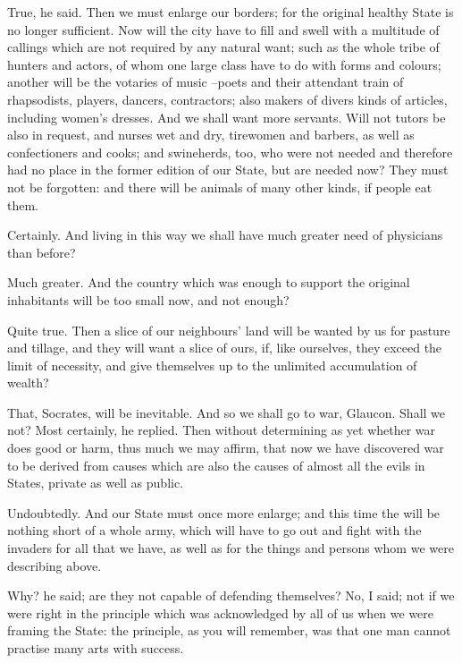 True, he said.
Then we must enlarge our borders; for the original healthy State is no longer sufficient. Now will the city have to fill and swell with a multitude of callings which are not required by any natural want; such as the whole tribe of hunters and actors, of whom one large class have to do with forms and colours; another will be the votaries of music --poets and their attendant train of rhapsodists, players, dancers, contractors; also makers of divers kinds of articles, including women's dresses. And we shall want more servants. Will not tutors be also in request, and nurses wet and dry, tirewomen and barbers, as well as confectioners and cooks; and swineherds, too, who were not needed and therefore had no place in the former edition of our State, but are needed now? They must not be forgotten: and there will be animals of many other kinds, if people eat them.

Certainly.
And living in this way we shall have much greater need of physicians than before?

Much greater.
And the country which was enough to support the original inhabitants will be too small now, and not enough?

Quite true.
Then a slice of our neighbours' land will be wanted by us for pasture and tillage, and they will want a slice of ours, if, like ourselves, they exceed the limit of necessity, and give themselves up to the unlimited accumulation of wealth?

That, Socrates, will be inevitable.
And so we shall go to war, Glaucon. Shall we not?
Most certainly, he replied.
Then without determining as yet whether war does good or harm, thus much we may affirm, that now we have discovered war to be derived from causes which are also the causes of almost all the evils in States, private as well as public.

Undoubtedly.
And our State must once more enlarge; and this time the will be nothing short of a whole army, which will have to go out and fight with the invaders for all that we have, as well as for the things and persons whom we were describing above.

Why? he said; are they not capable of defending themselves?
No, I said; not if we were right in the principle which was acknowledged by all of us when we were framing the State: the principle, as you will remember, was that one man cannot practise many arts with success.

